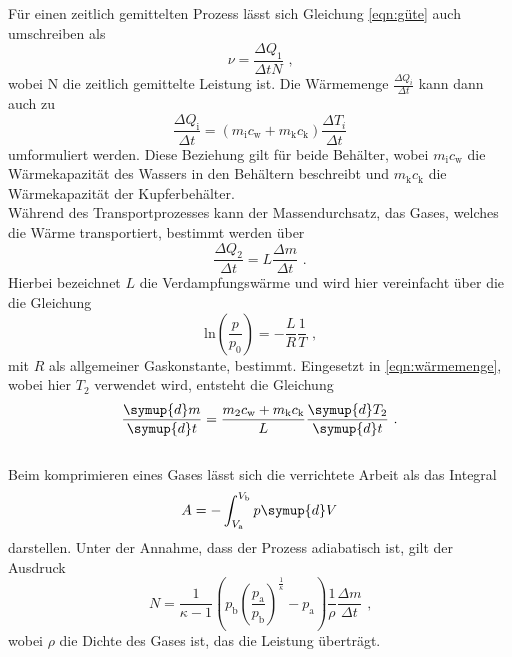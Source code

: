 \noindent Für einen zeitlich gemittelten Prozess lässt sich Gleichung \ref{eqn:güte} auch umschreiben als
\begin{equation}
    \nu=\frac{\Delta Q_1}{\Delta tN} \text{ ,}
    \label{eqn:gütemittel}
\end{equation}
wobei N die zeitlich gemittelte Leistung ist. Die Wärmemenge $\frac{\Delta Q_i}{\Delta t}$ kann dann auch zu
\begin{equation}
    \frac{\Delta Q_{\mathrm{i}}}{\Delta t}=(m_{\mathrm{i}}c_{\mathrm{w}}+m_{\mathrm{k}}c_{\mathrm{k}})\frac{\Delta T_i}{\Delta t}
    \label{eqn:wärmemenge}
\end{equation}
umformuliert werden. Diese Beziehung gilt für beide Behälter, wobei $m_{\mathrm{i}}c_{\mathrm{w}}$ die Wärmekapazität des Wassers
in den Behältern beschreibt und $m_{\mathrm{k}}c_{\mathrm{k}}$ die Wärmekapazität der Kupferbehälter.\\

\noindent Während des Transportprozesses kann der Massendurchsatz, das Gases, welches die
Wärme transportiert, bestimmt werden über
\begin{equation}
    \frac{\Delta Q_2}{\Delta t}=L\frac{\Delta m}{\Delta t} \text{ .}
    \label{eqn:Dampf}
\end{equation}
Hierbei bezeichnet $L$ die Verdampfungswärme und wird hier vereinfacht über die die Gleichung
\begin{equation}
    \mathrm{ln} \left(\frac{p}{p_0}\right)=-\frac{L}{R}\frac{1}{T}   \text{ ,}
    \label{eqn:verdampf}
\end{equation}
mit $R$ als allgemeiner Gaskonstante, bestimmt. Eingesetzt in \ref{eqn:wärmemenge}, wobei hier $T_2$ verwendet wird, 
entsteht die Gleichung
\begin{equation}
    \frac{\symup{d}m}{\symup{d}t}=\frac{m_2c_{\mathrm{w}}+m_{\mathrm{k}}c_{\mathrm{k}}}{L}\frac{\symup{d}T_2}{\symup{d}t} \text{ .}
    \label{eqn:masse}
\end{equation}
\\

\noindent Beim komprimieren eines Gases lässt sich die verrichtete Arbeit als das Integral
\begin{equation}
    A=-\int_{V_{\mathrm{a}}}^{V_{\mathrm{b}}}p \symup{d}V
\end{equation}
darstellen. Unter der Annahme, dass der Prozess adiabatisch ist, gilt der Ausdruck
\begin{equation}
    N=\frac{1}{\kappa -1}\left(p_{\mathrm{b}}\left(\frac{p_{\mathrm{a}}}{p_{\mathrm{b}}}\right)^{\frac{1}{\kappa}}-p_{\mathrm{a}}\right)\frac{1}{\rho}\frac{\Delta m}{\Delta t} \text{ ,}
    \label{eqn:leistung}
\end{equation}
wobei $\rho$ die Dichte des Gases ist, das die Leistung überträgt.